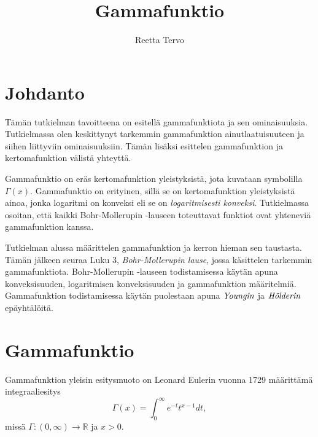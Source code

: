\documentclass[12pt]{article}
\title{Gammafunktio}
\author{Reetta Tervo}
\theoremstyle{definition}
\theoremstyle{plain}
\numberwithin{equation}{section}
\begin{document}
\maketitle

\newpage
\tableofcontents

\newpage
\section{Johdanto}
\onehalfspacing
Tämän tutkielman tavoitteena on esitellä gammafunktiota ja sen ominaisuuksia. Tutkielmassa olen keskittynyt tarkemmin gammafunktion ainutlaatuisuuteen ja siihen liittyviin ominaisuuksiin. Tämän lisäksi esittelen gammafunktion ja kertomafunktion välistä yhteyttä.

Gammafunktio on eräs kertomafunktion yleistyksistä, jota kuvataan symbolilla $\Gamma(x)$. Gammafunktio on erityinen, sillä se on kertomafunktion yleistyksistä ainoa, jonka logaritmi on konveksi eli se on \emph{logaritmisesti konveksi}. Tutkielmassa osoitan, että kaikki Bohr-Mollerupin -lauseen toteuttavat funktiot ovat yhteneviä gammafunktion kanssa.

Tutkielman alussa määrittelen gammafunktion ja kerron hieman sen taustasta. Tämän jälkeen seuraa Luku 3, \emph{Bohr-Mollerupin lause}, jossa käsittelen tarkemmin gammafunktiota. Bohr-Mollerupin -lauseen todistamisessa käytän apuna konveksisuuden, logaritmisen konveksisuuden ja gammafunktion määritelmiä. Gammafunktion todistamisessa käytän puolestaan apuna $\emph{Youngin}$ ja $\emph{Hölderin}$ epäyhtälöitä.

\newpage

\section{Gammafunktio}
Gammafunktion yleisin esitysmuoto on Leonard Eulerin vuonna 1729 määrittämä integraaliesitys
\begin{equation}\label{yhtalo:gammafunktio}
     \Gamma(x) = \int_{0}^{\infty} e^{-t} t^{x-1} dt,
\end{equation}
missä $\Gamma:(0,\infty)\rightarrow\mathbb{R}$ ja $x>0$.
\end{document}
